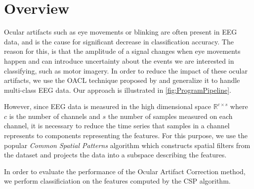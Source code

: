 \section{Overview}
Ocular artifacts such as eye movements or blinking are often present in EEG data, and is the cause for significant decrease in classification accuracy. The reason for this, is that the amplitude of a signal changes when eye movements happen and can introduce uncertainty about the events we are interested in classifying, such as motor imagery. In order to reduce the impact of these ocular artifacts, we use the OACL technique proposed by \citet{li2015ocular} and generalize it to handle multi-class EEG data. Our approach is illustrated in \cref{fig:ProgramPipeline}.

However, since EEG data is measured in the high dimensional space $\mathbb{R}^{c \times s}$ where $c$ is the number of channels and $s$ the number of samples measured on each channel, it is necessary to reduce the time series that samples in a channel represents to components representing the features. For this purpose, we use the popular \emph{Common Spatial Patterns} algorithm which constructs spatial filters from the dataset and projects the data into a subspace describing the features.

In order to evaluate the performance of the Ocular Artifact Correction method, we perform classificiation on the features computed by the CSP algorithm.
